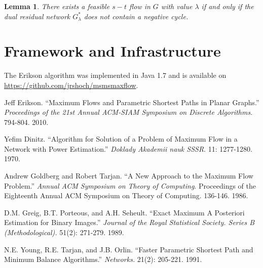 \documentclass[12pt]{article}
\newtheorem{lemma}{Lemma}
\begin{document}
\begin{lemma}
There exists a feasible $s-t$ flow in $G$ with value $\lambda$ if and only if the dual residual network $G^*_\lambda$ does not contain a negative cycle. 
\end{lemma}

\section{Framework and Infrastructure}

The Erikson algorithm was implemented in Java 1.7 and is available on \url{https://github.com/jrshoch/msmsmaxflow}. 

\newpage

\begin{thebibliography}{9}

        Jeff Erikson.
       ``Maximum Flows and Parametric Shortest Paths in Planar Graphs.''
       \emph{Proceedings of the 21st Annual ACM-SIAM Symposium on Discrete Algorithms}.
       794-804.
       2010.

        Yefim Dinitz.
        ``Algorithm for Solution of a Problem of Maximum Flow in a Network with Power Estimation.''
        \emph{Doklady Akademii nauk SSSR}.
        11: 1277-1280.
        1970.

        Andrew Goldberg and Robert Tarjan.
        ``A New Approach to the Maximum Flow Problem.''
        \emph{Annual ACM Symposium on Theory of Computing}.
        Proceedings of the Eighteenth Annual ACM Symposium on Theory of Computing.
        136-146.
        1986.

        D.M. Greig, B.T. Porteous, and A.H. Seheult.
        ``Exact Maximum A Posteriori Estimation for Binary Images.''
        \emph{Journal of the Royal Statistical Society. Series B (Methodological).}
        51(2): 271-279.
        1989.

        N.E. Young, R.E. Tarjan, and J.B. Orlin. 
        ``Faster Parametric Shortest Path and Minimum Balance Algorithms.''
        \emph{Networks.}
        21(2): 205-221.
        1991.

\end{thebibliography}
\end{document}
